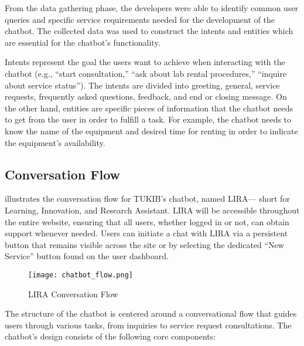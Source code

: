 From the data gathering phase, the developers were able to identify common user queries and specific service requirements needed for the development of the chatbot. The collected data was used to construct the intents and entities which are essential for the chatbot’s functionality. 

Intents represent the goal the users want to achieve when interacting with the chatbot (e.g., ``start consultation,” ``ask about lab rental procedures,” ``inquire about service status”). The intents are divided into greeting, general, service requests, frequently asked questions, feedback, and end or closing message. On the other hand, entities are specific pieces of information that the chatbot needs to get from the user in order to fulfill a task. For example, the chatbot needs to know the name of the equipment and desired time for renting in order to indicate the equipment's availability. 

\subsection{Conversation Flow}

 illustrates the conversation flow for TUKIB's chatbot, named LIRA— short for Learning, Innovation, and Research Assistant. LIRA will be accessible throughout the entire website, ensuring that all users, whether logged in or not, can obtain support whenever needed. Users can initiate a chat with LIRA via a persistent button that remains visible across the site or by selecting the dedicated “New Service” button found on the user dashboard.

\newpage

\begin{figure}[h]
	\centering 
	\texttt{[image: chatbot\_flow.png]}
	\caption{LIRA Conversation Flow}
	\label{fig:chatbot_flow}
\end{figure}

The structure of the chatbot is centered around a conversational flow that guides users through various tasks, from inquiries to service request consultations. The chatbot’s design consists of the following core components:

